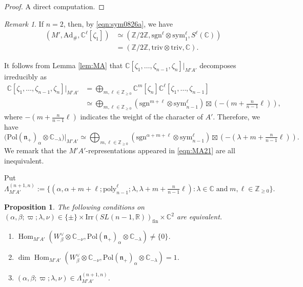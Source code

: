 \documentclass[reqno,11pt]{amsart}
\newtheorem{prop}[equation]{Proposition}
\theoremstyle{remark}
\newtheorem{rem}[equation]{Remark}
\theoremstyle{definition}
\numberwithin{equation}{section}
\newcommand{\gb}{\beta}
\newcommand{\ga}{\alpha}
\newcommand{\gL}{\Lambda}
\newcommand{\fn}{{\mathfrak n}}
\newcommand{\R}{\mathbb{R}}
\newcommand{\C}{\mathbb{C}}
\newcommand{\Z}{\mathbb{Z}}
\newcommand{\Ad}{\mathrm{Ad}}
\newcommand{\Hom}{\operatorname{Hom}}
\newcommand{\Pol}{\mathrm{Pol}}
\newcommand{\poly}{\mathrm{poly}}
\newcommand{\Irr}{\mathrm{Irr}}
\newcommand{\triv}{\mathrm{triv}}
\newcommand{\fin}{\mathrm{fin}}
\newcommand{\sym}{\mathrm{sym}}
\newcommand{\sgn}{\mathrm{sgn}}
\begin{document}
\begin{proof}
A direct computation.
\end{proof}

\begin{rem}\label{rem:sym0826a}
If $n=2$, then, by \eqref{eqn:sym0826a}, we have 
\begin{align*}
(M', \Ad_\#, \C^\ell[\zeta_1]) 
&\simeq (\Z/2\Z, \sgn^\ell \otimes \sym^\ell_{1}, S^\ell(\C))\\
&=(\Z/2\Z, \triv \otimes \triv, \C).
\end{align*}
\end{rem}

It follows from Lemma \ref{lem:MA} that 
$\C[\zeta_1, \ldots, \zeta_{n-1},\zeta_n]\vert_{M'A'}$ decomposes irreducibly as
\begin{align}\label{eqn:MA21}
\C[\zeta_1, \ldots, \zeta_{n-1},\zeta_n]\vert_{M'A'}
&=
\bigoplus_{m, \ell \in \Z_{\geq 0}} 
\C^m[\zeta_n] 
\C^\ell[\zeta_1,\ldots,\zeta_{n-1}]\nonumber\\
&\simeq
\bigoplus_{m, \ell \in \Z_{\geq 0}} 
(\sgn^{m+\ell}\otimes\sym^\ell_{n-1}) \boxtimes (-(m+\tfrac{n}{n-1}\ell)),
\end{align}
where  $-(m+\tfrac{n}{n-1}\ell)$ indicates the weight of the character of $A'$.
Therefore, 
we have
\begin{equation*}
\big(\Pol(\fn_+)_{\alpha}
\otimes \C_{-\lambda}\big)\vert_{M'A'}
\simeq 
\bigoplus_{m, \ell \in \Z_{\geq 0}} 
(\sgn^{\ga+m+\ell}\otimes\sym^\ell_{n-1}) \boxtimes (-(\lambda+m+\tfrac{n}{n-1}\ell)).
\end{equation*}
We remark that the $M'A'$-representations appeared in \eqref{eqn:MA21} are all inequivalent.

Put 
\begin{equation}\label{eqn:paraMA}
\gL^{(n+1,n)}_{M'A'}:=
\{(\ga, \ga+m+\ell; \poly^\ell_{n-1}; \lambda, \lambda + m+\tfrac{n}{n-1}\ell):
\lambda \in \C\; \text{and}\; m, \ell \in \Z_{\geq 0}\}.
\end{equation}

\begin{prop}\label{prop:MA}
The following conditions on 
$(\ga,\gb;\varpi;\lambda,\nu) \in 
\{\pm\} \times \Irr(SL(n-1,\R))_{\fin} \times \C^2$ are equivalent.
\begin{enumerate}
\item[\emph{(i)}]
$\Hom_{M'A'}(W^\vee_\beta \otimes \C_{-\nu}, \Pol(\fn_+)_\ga \otimes \C_{-\lambda})
\neq \{0\}$.
\item[\emph{(ii)}]
$\dim
\Hom_{M'A'}(W^\vee_\beta \otimes \C_{-\nu}, \Pol(\fn_+)_\ga \otimes \C_{-\lambda})=1$.
\item[\emph{(iii)}]
$(\ga,\gb;\varpi;\lambda,\nu) \in \gL^{(n+1,n)}_{M'A'}$.
\end{enumerate}
\end{prop}
\end{document}
